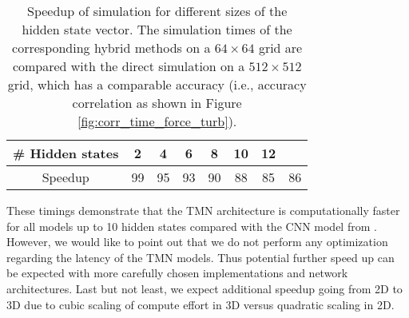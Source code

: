 
\begin{table} [h!] 
\small
    \centering
        \begin{tabular}{@{\,}ccccccc|c@{\,}} 
        \toprule
        \# Hidden states &  2 & 4 & 6 & 8 & 10 & 12 & \citeauthor{kochkov2021machine}\\
        \hline 
        Speedup   &  
        99 & 95 & 93 & 90 & 88 & 85 & 86 \\
        \bottomrule
    \end{tabular}
    \caption{Speedup of simulation for different sizes of the hidden state vector. The simulation times of the corresponding hybrid methods on a $64\times64$ grid are compared with the direct simulation on a $512\times512$ grid, which has a comparable accuracy (i.e., accuracy correlation as shown in Figure \ref{fig:corr_time_force_turb}).}
    \label{tab:models_speed}
\end{table}



These timings demonstrate that the TMN architecture is computationally faster for all models up to 10 hidden states compared with the CNN model from \citeauthor{kochkov2021machine}. However, we would like to point out that we do not perform any optimization regarding the latency of the TMN models. Thus potential further speed up can be expected with more carefully chosen implementations and network architectures. Last but not least, we expect additional speedup going from 2D to 3D due to cubic scaling of compute effort in 3D versus quadratic scaling in 2D.

